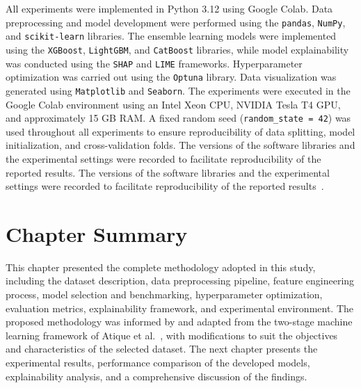 All experiments were implemented in Python 3.12 using Google Colab. Data preprocessing and model development were performed using the \texttt{pandas}, \texttt{NumPy}, and \texttt{scikit-learn} libraries. The ensemble learning models were implemented using the \texttt{XGBoost}, \texttt{LightGBM}, and \texttt{CatBoost} libraries, while model explainability was conducted using the \texttt{SHAP} and \texttt{LIME} frameworks. Hyperparameter optimization was carried out using the \texttt{Optuna} library. Data visualization was generated using \texttt{Matplotlib} and \texttt{Seaborn}. The experiments were executed in the Google Colab environment using an Intel Xeon CPU, NVIDIA Tesla T4 GPU, and approximately 15 GB RAM. A fixed random seed (\texttt{random\_state = 42}) was used throughout all experiments to ensure reproducibility of data splitting, model initialization, and cross-validation folds. The versions of the software libraries and the experimental settings were recorded to facilitate reproducibility of the reported results.
The versions of the software libraries and the experimental settings were recorded to facilitate reproducibility of the reported results~\cite{atique2026explainable}.


\section{Chapter Summary}

This chapter presented the complete methodology adopted in this study, including the dataset description, data preprocessing pipeline, feature engineering process, model selection and benchmarking, hyperparameter optimization, evaluation metrics, explainability framework, and experimental environment. The proposed methodology was informed by and adapted from the two-stage machine learning framework of Atique et al.~\cite{atique2026explainable}, with modifications to suit the objectives and characteristics of the selected dataset. The next chapter presents the experimental results, performance comparison of the developed models, explainability analysis, and a comprehensive discussion of the findings.